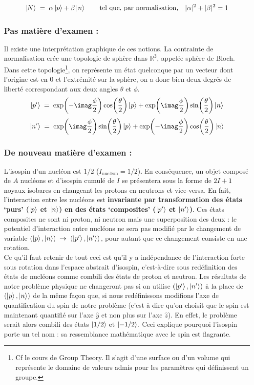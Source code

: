 \[
    \ket{N} \; = \; \alpha \ket{p} + \beta\ket{n}
    \qquad \text{tel que, par normalisation,} \quad
    |\alpha|^2+|\beta|^2=1
\]
\subsubsection*{Pas matière d'examen :}
Il existe une interprétation graphique de ces notions. La contrainte de normalisation crée une topologie de sphère dans $\mathbb{R}^3$, appelée sphère de Bloch. Dans cette topologie\footnote{Cf le cours de Group Theory. Il s'agit d'une surface ou d'un volume qui représente le domaine de valeurs admis pour les paramètres qui définissent un groupe.}, on représente un état quelconque par un vecteur dont l'origine est en 0 et l'extrémité sur la sphère, on a donc bien deux degrés de liberté correspondant aux deux angles $\theta$ et $\phi$.\\
\[
    \ket{p'} \eq \exp(-\imag\dfrac{\phi}{2})\cos(\dfrac{\theta}{2})\ket{p} + \exp(\imag\dfrac{\phi}{2})\sin(\dfrac{\theta}{2})\ket{n}
\]
\[
    \ket{n'} \eq \exp(\imag\dfrac{\phi}{2})\sin(\dfrac{\theta}{2})\ket{p} + \exp(-\imag\dfrac{\phi}{2})\cos(\dfrac{\theta}{2})\ket{n}
\]


\subsubsection*{De nouveau matière d'examen :}
L'isospin d'un nucléon est $1/2$ ($I_{\text{nucléon}} =1/2$). En conséquence, un objet composé de $A$ nucléons et d'isospin cumulé de $I$ se présentera sous la forme de $2I+1$ noyaux isobares en changeant les protons en neutrons et vice-versa. En fait, l'interaction entre les nucléons est \textbf{invariante par transformation des états `purs' ($\ket{p}$ et $\ket{n}$) en des états `composites' ($\ket{p'}$ et $\ket{n'}$)}. Ces états composites ne sont ni proton, ni neutron mais une superposition des deux : le potentiel d'interaction entre nucléons ne sera pas modifié par le changement de variable $(\ket{p},\ket{n}) \;\rightarrow\; (\ket{p'},\ket{n'})$, pour autant que ce changement consiste en une rotation.\\

Ce qu'il faut retenir de tout ceci est qu'il y a indépendance de l'interaction forte sous rotation dans l'espace abstrait d'isospin, c'est-à-dire sous redéfinition des états de nucléons comme combili des états de proton et neutron. Les résultats de notre problème physique ne changeront pas si on utilise $(\ket{p'},\ket{n'})$ à la place de $(\ket{p},\ket{n})$ de la même façon que, si nous redéfinissons modifions l'axe de quantification du spin de notre problème (c'est-à-dire qu'on choisit que le spin est maintenant quantifié sur l'axe $\hat{y}$ et non plus sur l'axe $\hat{z}$). En effet, le problème serait alors combili des états $\ket{1/2}$ et $\ket{-1/2}$.
Ceci explique pourquoi l'isospin porte un tel nom : sa ressemblance mathématique avec le spin est flagrante.

